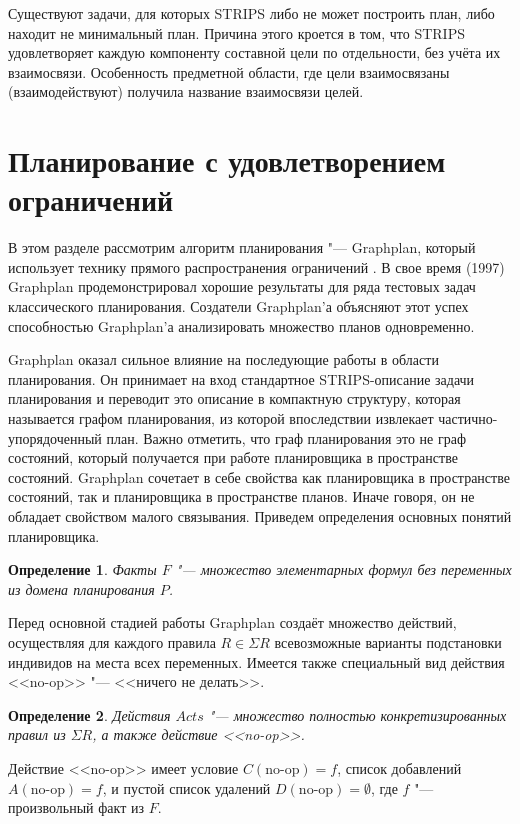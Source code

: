 \documentclass[b5paper,11pt]{book}
\newtheorem{Def}{Определение}
\numberwithin{Def}{section}
\numberwithin{Th}{chapter}
\numberwithin{St}{chapter}
\begin{document}
	Существуют задачи, для которых STRIPS либо не может построить план, либо находит не минимальный план. Причина этого кроется в том, что STRIPS удовлетворяет каждую компоненту составной цели по отдельности, без учёта их взаимосвязи. Особенность предметной области, где цели взаимосвязаны (взаимодействуют) получила название взаимосвязи целей.
	
	\section{Планирование с удовлетворением ограничений}
	
	В этом разделе рассмотрим алгоритм планирования "--- Graphplan, который использует технику прямого распространения ограничений \cite{Blum1997}. В свое время (1997) Graphplan продемонстрировал хорошие результаты для ряда тестовых задач классического планирования. Создатели Graphplan'а объясняют этот успех способностью Graphplan'а анализировать множество планов одновременно. 
	
	Graphplan оказал сильное влияние на последующие работы в области планирования. Он принимает на вход стандартное STRIPS-описание задачи планирования и переводит это описание в компактную структуру, которая называется графом планирования, из которой впоследствии извлекает частично-упорядоченный план. Важно отметить, что граф планирования это не граф состояний, который получается при работе планировщика в пространстве состояний. Graphplan сочетает в себе свойства как планировщика в пространстве состояний, так и планировщика в пространстве планов. Иначе говоря, он не обладает свойством малого связывания. Приведем определения основных понятий планировщика.
	
	\begin{Def}
		Факты $F$ "--- множество элементарных формул без переменных из домена планирования $P$.
	\end{Def}
	
	Перед основной стадией работы Graphplan создаёт множество действий, осуществляя для каждого правила $R\in\Sigma R$ всевозможные варианты подстановки индивидов на места всех переменных. Имеется также специальный вид действия <<no-op>> "--- <<ничего не делать>>.
	
	\begin{Def}
		Действия $Acts$ "--- множество полностью конкретизированных правил из $\Sigma R$, а также действие <<no-op>>.
	\end{Def}

	Действие <<no-op>> имеет условие $C(\text{no-op})=f$, список добавлений $A(\text{no-op})=f$, и пустой список удалений $D(\text{no-op})=\emptyset$, где $f$ "--- произвольный факт из $F$.
\end{document}
